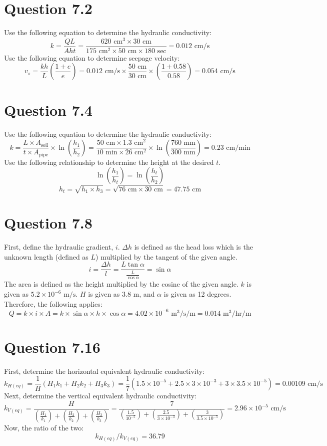 \documentclass{article}
\begin{document}
\section*{Question 7.2}
Use the following equation to determine the hydraulic conductivity: 
\[k=\frac{QL}{Aht}=\frac{620\text{ cm}^3\times 30\text{ cm}}{175\text{ cm}^2\times 50\text{ cm}\times 180\text{ sec}}=\boxed{0.012\text{ cm/s}}\] 
Use the following equation to determine seepage velocity: 
\[v_s=\frac{kh}{L}\left(\frac{1+e}{e}\right)=0.012\text{ cm/s}\times \frac{50\text{ cm}}{30\text{ cm}}\times\left(\frac{1+0.58}{0.58}\right)=\boxed{0.054\text{ cm/s}}\]
\section*{Question 7.4}
Use the following equation to determine the hydraulic conductivity: 
\[k=\frac{L\times A_\text{soil}}{t\times A_\text{pipe}}\times \ln\left(\frac{h_1}{h_2}\right)=\frac{50\text{ cm}\times 1.3\text{ cm}^2}{10\text{ min}\times 26\text{ cm}^2}\times \ln\left(\frac{760\text{ mm}}{300\text{ mm}}\right)=\boxed{0.23\text{ cm/min}}\]
Use the following relationship to determine the height at the desired $t$.
\[\ln\left(\frac{h_1}{h_t}\right)=\ln\left(\frac{h_t}{h_2}\right)\]
\[h_t=\sqrt{h_1\times h_3}=\sqrt{76\text{ cm}\times 30\text{ cm}}=\boxed{47.75\text{ cm}}\]
\section*{Question 7.8} 
First, define the hydraulic gradient, $i$. $\Delta h$ is defined as the head loss which is the unknown length (defined as $L$) multiplied by the tangent of the given angle.
\[i=\frac{\Delta h}{l}=\frac{L\tan\alpha}{\frac{L}{\cos\alpha}}=\sin\alpha\] 
The area is defined as the height multiplied by the cosine of the given angle. $k$ is given as $5.2\times 10^{-6} \text{ m/s}$. $H$ is given as 3.8 m, and $\alpha$ is given as 12 degrees. Therefore, the following applies: 
\[Q = k\times i\times A= k\times \sin\alpha \times h\times \cos\alpha=4.02\times 10^{-6} \text{ m}^3\text{/s/m}=\boxed{0.014 \text{ m}^3\text{/hr/m}}\] 
\section*{Question 7.16} 
First, determine the horizontal equivalent hydraulic conductivity: 
\[k_{H(eq)}=\frac{1}{H}\left(H_1k_1+H_2k_2+H_3k_3\right)=\frac{1}{7}\left(1.5\times 10^{-5}+2.5\times 3\times 10^{-3}+3\times 3.5\times 10^{-5}\right)=0.00109 \text{ cm/s}\]
Next, determine the vertical equivalent hydraulic conductivity: 
\[k_{V(eq)}=\frac{H}{\left(\frac{H_1}{k_1}\right)+\left(\frac{H_2}{k_2}\right)+\left(\frac{H_3}{k_3}\right)}=\frac{7}{\left(\frac{1.5}{10^{-5}}\right)+\left(\frac{2.5}{3\times 10^{-3}}\right)+\left(\frac{3}{3.5\times 10^{-5}}\right)}=2.96\times 10^{-5} \text{ cm/s}\]
Now, the ratio of the two: 
\[k_{H(eq)}/k_{V(eq)}=\boxed{36.79}\]
\newpage 
\end{document}
